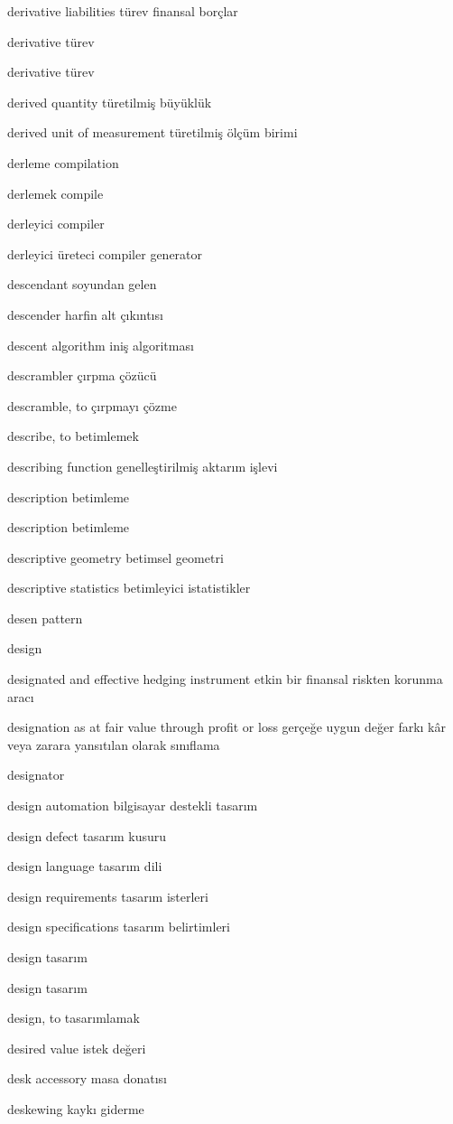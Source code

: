 \documentclass[12pt,fleqn]{article}\usepackage{../../common}
\begin{document}
derivative liabilities türev finansal borçlar

derivative türev

derivative türev

derived quantity türetilmiş büyüklük

derived unit of measurement türetilmiş ölçüm birimi

derleme compilation

derlemek compile

derleyici compiler

derleyici üreteci compiler generator

descendant soyundan gelen

descender harfin alt çıkıntısı

descent algorithm iniş algoritması

descrambler çırpma çözücü

descramble, to çırpmayı çözme

describe, to betimlemek

describing function genelleştirilmiş aktarım işlevi

description betimleme

description betimleme

descriptive geometry betimsel geometri

descriptive statistics betimleyici istatistikler

desen pattern

design

designated and effective hedging instrument etkin bir finansal riskten korunma aracı

designation as at fair value through profit or loss gerçeğe uygun değer farkı kâr veya zarara yansıtılan olarak sınıflama

designator

design automation bilgisayar destekli tasarım

design defect tasarım kusuru

design language tasarım dili

design requirements tasarım isterleri

design specifications tasarım belirtimleri

design tasarım

design tasarım

design, to tasarımlamak

desired value istek değeri

desk accessory masa donatısı

deskewing kaykı giderme
\end{document}
